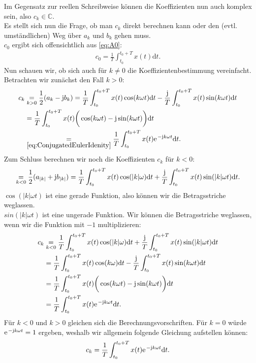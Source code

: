 \documentclass[11pt,a4paper,DIV=12]{scrartcl}
\newcommand{\diff}{\mathrm{d}}
\begin{document}
Im Gegensatz zur reellen Schreibweise können die Koeffizienten nun auch komplex sein, also $c_k\in\mathbb{C}$.\\
Es stellt sich nun die Frage, ob man $c_k$ direkt berechnen kann oder den (evtl. umständlichen) Weg über $a_k$ und $b_k$ gehen muss.\\
$c_0$ ergibt sich offensichtlich aus \eqref{eq:A0}:
\begin{align}
	c_0=\frac{1}{T}\int_{t_0}^{t_0+T}x(t)\diff t.
\end{align}
Nun schauen wir, ob sich auch für $k\neq0$ die Koeffizientenbestimmung vereinfacht.
Betrachten wir zunächst den Fall $k>0$:
\begin{align}
	c_k&\underset{k>0}{=}\frac{1}{2}(a_k-\im b_k)=\frac{1}{T}\int_{t_0}^{t_0+T}x(t)\cos(k \omega t)\diff t-\frac{\im}{T}\int_{t_0}^{t_0+T}x(t)\sin(k \omega t)\diff t\nonumber\\&=\frac{1}{T}\int_{t_0}^{t_0+T}x(t)\bigg (\cos(k\omega t)-\im\sin(k\omega t) \bigg )\diff t\nonumber\\
	&\underset{\eqref{eq:ConjugatedEulerIdenity}}{=}\frac{1}{T}\int_{t_0}^{t_0+T}x(t)\e^{-\im k \omega t}\diff t.
\end{align}
Zum Schluss berechnen wir noch die Koeffizienten $c_k$ für $k<0$:
\begin{align}
	\underset{k<0}{=}\frac{1}{2}(a_{|k|}+\im b_{|k|})=\frac{1}{T}\int_{t_0}^{t_0+T}x(t)\cos(|k|\omega)\diff t+\frac{\im}{T}\int_{t_0}^{t_0+T}x(t)\sin(|k| \omega t)\diff t.
\end{align}
$\cos(|k| \omega t)$ ist eine gerade Funktion, also können wir die Betragsstriche weglassen.\\
$sin(|k| \omega t)$ ist eine ungerade Funktion. Wir können die Betragsstriche weglassen, wenn wir die Funktion mit $-1$ multiplizieren:
\begin{align}
	c_k&\underset{k<0}{=}\frac{1}{T}\int_{t_0}^{t_0+T}x(t)\cos(|k|\omega)\diff t+\frac{\im}{T}\int_{t_0}^{t_0+T}x(t)\sin(|k| \omega t)\diff t\nonumber\\
	&=\frac{1}{T}\int_{t_0}^{t_0+T}x(t)\cos(k\omega)\diff t-\frac{\im}{T}\int_{t_0}^{t_0+T}x(t)\sin(k \omega t)\diff t\nonumber\\
	&=\frac{1}{T}\int_{t_0}^{t_0+T}x(t)\bigg (\cos(k\omega t)-\im\sin(k\omega t)\bigg )\diff t\nonumber\\
	&=\frac{1}{T}\int_{t_0}^{t_0+T}x(t)\e^{-\im k \omega t}\diff t.
\end{align}
Für $k<0$ und $k>0$ gleichen sich die Berechnungsvorschriften. Für $k=0$ würde $\e^{-\im k \omega t}=1$ ergeben, weshalb wir allgemein folgende Gleichung aufstellen können:
\begin{align}
	c_k=\frac{1}{T}\int_{t_0}^{t_0+T}x(t)\e^{-\im k \omega t}\diff t.
\end{align}
\newpage
\end{document}
